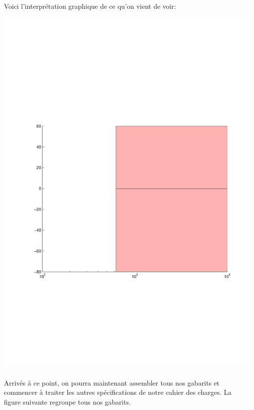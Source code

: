 \documentclass[12pt, a4paper, openany]{report}
\begin{document}
 \paragraph{}
 Voici l'interprétation graphique de ce qu'on vient de voir:\\

\begin{center}
    \includegraphics[scale=0.5]{gabarit4.pdf}
    \label{fig10}
  \end{center}      

\paragraph{}
Arrivés à ce point, on pourra maintenant assembler tous nos gabarits et commencer à traiter les autres spécifications de notre cahier des charges. La figure suivante regroupe tous nos gabarits.\\
\end{document}
